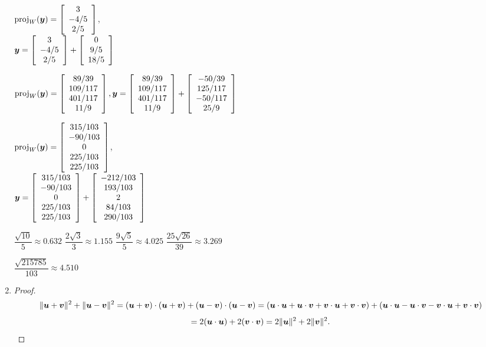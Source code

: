 \begin{enumerate}[!HW!, start=1]
\begin{multicols}{3}
\itemspade $\proj_W(\bb y) = \mtx{c}{3\\-4/5\\2/5}$,\\ $\bb y  =  \mtx{c}{3\\-4/5\\2/5}+ \mtx{c}{0\\9/5\\18/5}$
\end{multicols}
\begin{multicols}{2}
\itemspade $\proj_W(\bb y) =\mtx{c}{89/39\\ 109/117\\ 401/117\\ 11/9},\\
\bb y = \mtx{c}{89/39\\ 109/117\\ 401/117\\ 11/9} + \mtx{c}{-50/39\\ 125/117\\ -50/117\\ 25/9}$

\itemspade $\proj_W(\bb y) = \mtx{c}{315/103\\ -90/103 \\ 0 \\ 225/103 \\ 225/103}$,\\
$\bb y = \mtx{c}{315/103\\ -90/103 \\ 0 \\ 225/103 \\ 225/103} + \mtx{c}{-212/103 \\ 193/103 \\ 2 \\ 84/103 \\ 290/103}$
\end{multicols}
\begin{multicols}{4}
\itemspade $\dfrac{\sqrt{10}}{5} \approx 0.632$
\itemspade $\dfrac{2\sqrt{3}}{3} \approx 1.155$
\itemspade $\dfrac{9\sqrt{5}}{5} \approx 4.025$
\itemspade \mbox{$\dfrac{25\sqrt{26}}{39} \approx 3.269$}
\end{multicols}
\itemspade \mbox{$\dfrac{\sqrt{215785}}{103} \approx 4.510$}
\item \begin{proof}
\[\Vert \bb u+\bb v\Vert^2 + \Vert\bb u - \bb v\Vert^2 = (\bb u + \bb v)\cdot (\bb u+\bb v) + (\bb u - \bb v)\cdot (\bb u-\bb v) = (\bb u\cdot \bb u + \bb u \cdot \bb v + \bb v\cdot \bb u + \bb v\cdot \bb v) + (\bb u\cdot \bb u - \bb u \cdot \bb v - \bb v\cdot \bb u + \bb v\cdot \bb v)\]\[ = 2(\bb u\cdot \bb u) + 2(\bb v\cdot \bb v) = 2\Vert \bb u\Vert^2 + 2\Vert \bb v\Vert^2. \qedhere\]
\end{proof}
\end{enumerate}

\vspace{-15 pt}